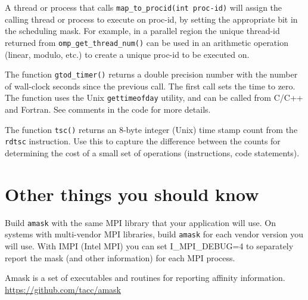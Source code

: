 \documentclass[10pt,a4paper]{report}
\begin{document}
A thread or process that calls \verb+map_to_procid(int proc-id)+ will assign the
calling thread or process to execute on proc-id, by setting the appropriate
bit in the scheduling mask.  For example, in a parallel region the unique
thread-id returned from \verb+omp_get_thread_num()+ can be used in an
arithmetic operation (linear, modulo, etc.) to create a unique proc-id to be executed on. 

The function \verb+gtod_timer()+ returns a double precision number with the number
of wall-clock seconds since the previous call.  The first call sets the time
to zero. The function uses the Unix \verb+gettimeofday+ utility, and  can be called from 
C/C++ and Fortran.  See comments in the code for
more details.

The function \verb+tsc()+ returns an 8-byte integer (Unix) time stamp count from
the \verb+rdtsc+ instruction. Use this to capture the difference between the counts for
determining 
the cost of a small set of operations (instructions, code statements). 



\section{Other things you should know}
Build \verb+amask+ with the same MPI library that your 
application will use.  On systems with multi-vendor MPI libraries,
build \verb+amask+ for each vendor version you will use.
With IMPI (Intel MPI) you can set I\_MPI\_DEBUG=4 to
separately report the mask (and other information) for each MPI process. 


\FloatBarrier
{}
\begin{thebibliography}{00}


 Amask is a set of executables and routines for reporting affinity information. \href{https://github.com/tacc/amask}{https://github.com/tacc/amask}


\end{thebibliography}
\end{document}
